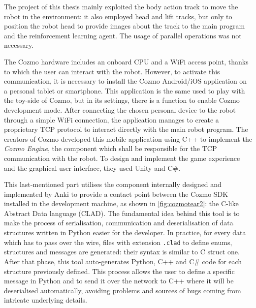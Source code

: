 The project of this thesis mainly exploited the body action track to move the robot in the environment: it also employed head and lift tracks, but only to position the robot head to provide images about the track to the main program and the reinforcement learning agent. The usage of parallel operations was not necessary.

The Cozmo hardware includes an onboard CPU and a WiFi access point, thanks to which the user can interact with the robot. However, to activate this communication, it is necessary to install the Cozmo Android/iOS application on a personal tablet or smartphone. This application is the same used to play with the toy-side of Cozmo, but in its settings, there is a function to enable Cozmo development mode.
After connecting the chosen personal device to the robot through a simple WiFi connection, the application manages to create a proprietary TCP protocol to interact directly with the main robot program.
The creators of Cozmo developed this mobile application using C++ to implement the \textit{Cozmo Engine}, the component which shall be responsible for the TCP communication with the robot. To design and implement the game experience and the graphical user interface, they used Unity and C\#.

This last-mentioned part utilises the component internally designed and implemented by Anki to provide a contact point between the Cozmo SDK installed in the development machine, as shown in \vref{fig:cozmotear2}: the C-like Abstract Data language (CLAD).
The fundamental idea behind this tool is to make the process of serialisation, communication and deserialisation of data structures written in Python easier for the developer. In practice, for every data which has to pass over the wire, files with extension \texttt{.clad} to define enums, structures and messages are generated: their syntax is similar to C struct one. After that phase, this tool auto-generates Python, C++ and C\# code for each structure previously defined. This process allows the user to define a specific message in Python and to send it over the network to C++ where it will be deserialised automatically, avoiding problems and sources of bugs coming from intricate underlying details.


